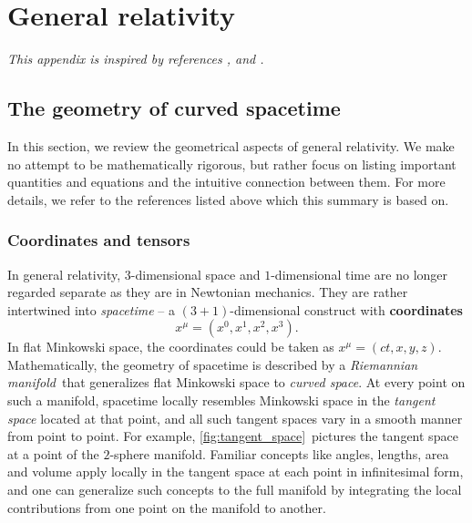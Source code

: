 \appendix

\chapter{General relativity}
\label{chap:gr}

\textit{This appendix is inspired by references \cite{ref:carroll}, \cite{ref:mtw} and \cite{ref:mika_gr_notes}.}

\section{The geometry of curved spacetime}
\label{chap:gr_summary} %

\newcommand\pdvx[2]{\pdv{x^{#1}}{x^{#2}}}

In this section, we review the geometrical aspects of general relativity.
We make no attempt to be mathematically rigorous, but rather focus on listing important quantities and equations and the intuitive connection between them.
For more details, we refer to the references listed above which this summary is based on.

\subsection{Coordinates and tensors}

In general relativity, $3$-dimensional space and $1$-dimensional time are no longer regarded separate as they are in Newtonian mechanics.
They are rather intertwined into \emph{spacetime} -- a $(3+1)$-dimensional construct with \textbf{coordinates}
\begin{equation}
	x^\mu = (x^0, x^1, x^2, x^3) .
\end{equation}
In flat Minkowski space, the coordinates could be taken as $x^\mu = (ct, x, y, z)$.
Mathematically, the geometry of spacetime is described by a \emph{Riemannian manifold} that generalizes flat Minkowski space to \emph{curved space}.
At every point on such a manifold, spacetime locally resembles Minkowski space in the \emph{tangent space} located at that point, and all such tangent spaces vary in a smooth manner from point to point.
For example, \cref{fig:tangent_space} pictures the tangent space at a point of the $2$-sphere manifold.
Familiar concepts like angles, lengths, area and volume apply locally in the tangent space at each point in infinitesimal form, and one can generalize such concepts to the full manifold by integrating the local contributions from one point on the manifold to another.

